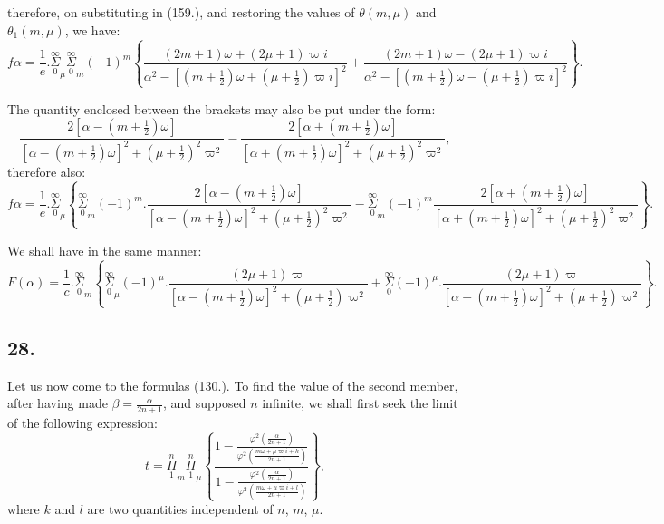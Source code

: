 \documentclass{article}
\begin{document}
therefore, on substituting in (159.), and restoring the values of $\theta(m,\mu)$ and $\theta_{1}(m,\mu)$, we have:
\[ f\alpha=\frac{1}{e}.\overset{\infty}{\underset{0}{\Sigma}}_{\mu}\overset{\infty}{\underset{0}{\Sigma}}_{m}(-1)^{m}\left\{\frac{(2m+1)\omega+(2\mu+1)\varpi i}{\alpha^{2}-[(m+\tfrac{1}{2})\omega+(\mu+\tfrac{1}{2})\varpi i]^{2}}+\frac{(2m+1)\omega-(2\mu+1)\varpi i}{\alpha^{2}-[(m+\tfrac{1}{2})\omega-(\mu+\tfrac{1}{2})\varpi i]^{2}}\right\}. \tag{160.} \]

The quantity enclosed between the brackets may also be put under the form:
\[ \frac{2[\alpha-(m+\tfrac{1}{2})\omega]}{[\alpha-(m+\tfrac{1}{2})\omega]^{2}+(\mu+\tfrac{1}{2})^{2}\varpi^{2}}-\frac{2[\alpha+(m+\tfrac{1}{2})\omega]}{[\alpha+(m+\tfrac{1}{2})\omega]^{2}+(\mu+\tfrac{1}{2})^{2}\varpi^{2}}, \]
therefore also:
\[ f\alpha=\frac{1}{e}.\overset{\infty}{\underset{0}{\Sigma}}_{\mu}\left\{\overset{\infty}{\underset{0}{\Sigma}}_{m}(-1)^{m}.\frac{2[\alpha-(m+\tfrac{1}{2})\omega]}{[\alpha-(m+\tfrac{1}{2})\omega]^{2}+(\mu+\tfrac{1}{2})^{2}\varpi^{2}}-\overset{\infty}{\underset{0}{\Sigma}}_{m}(-1)^{m}\frac{2[\alpha+(m+\tfrac{1}{2})\omega]}{[\alpha+(m+\tfrac{1}{2})\omega]^{2}+(\mu+\tfrac{1}{2})^{2}\varpi^{2}}\right\}. \tag{161.} \]

We shall have in the same manner:
\[ F(\alpha)=\frac{1}{c}.\overset{\infty}{\underset{0}{\Sigma}}_{m}\left\{\overset{\infty}{\underset{0}{\Sigma}}_{\mu}(-1)^{\mu}.\frac{(2\mu+1)\varpi}{[\alpha-(m+\tfrac{1}{2})\omega]^{2}+(\mu+\tfrac{1}{2})\varpi^{2}}+\overset{\infty}{\underset{0}{\Sigma}}(-1)^{\mu}.\frac{(2\mu+1)\varpi}{[\alpha+(m+\tfrac{1}{2})\omega]^{2}+(\mu+\tfrac{1}{2})\varpi^{2}}\right\}. \tag{162.} \]

\subsection*{28.}

Let us now come to the formulas (130.). To find the value of the second member, after having made $\beta=\frac{\alpha}{2n+1}$, and supposed $n$ infinite, we shall first seek the limit of the following expression:
\[ t=\overset{n}{\underset{1}{\Pi}}_{m}\overset{n}{\underset{1}{\Pi}}_{\mu}\left\{\frac{1-\frac{\varphi^{2}\left(\frac{\alpha}{2n+1}\right)}{\varphi^{2}\left(\frac{m\omega+\mu\varpi i+k}{2n+1}\right)}}{1-\frac{\varphi^{2}\left(\frac{\alpha}{2n+1}\right)}{\varphi^{2}\left(\frac{m\omega+\mu\varpi i+l}{2n+1}\right)}}\right\}, \tag{163.} \]
where $k$ and $l$ are two quantities independent of $n$, $m$, $\mu$.
\end{document}
